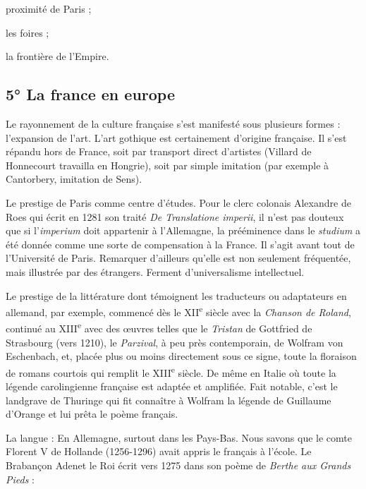 \documentclass[french,twoside]{book} %
\def\bignobreak{\ifdim\lastskip<\bigskipamount
  \removelastskip\nopagebreak\bigskip\fi}
\newcommand{\labelblock}[1]{\bigskip{\color{rubric}\bfseries\centering #1\par}\bignobreak}
\begin{document}
\begin{listalpha}[itemsep=0pt,]
\item[] \hspace{-1.5em}{\bfseries Mais la Champagne :}
\item proximité de Paris ;
\item les foires ;
\item la frontière de l’Empire.

\end{listalpha}\subsection[5° La france en europe]{5° La france en europe}
\label{c03c5}

\labelblock{— Aspect culturel.}

\noindent Le rayonnement de la culture française s’est manifesté sous plusieurs formes : l’expansion de l’art. L’art gothique est certainement d’origine française. Il s’est répandu hors de France, soit par transport direct d’artistes (Villard de Honnecourt travailla en Hongrie), soit par simple imitation (par exemple à Cantorbery, imitation de Sens).\par
Le prestige de Paris comme centre d’études. Pour le clerc colonais Alexandre de Roes qui écrit en 1281 son traité {\itshape De Translatione imperii}, il n’est pas douteux que si l’{\itshape imperium} doit appartenir à l’Allemagne, la prééminence dans le {\itshape studium} a été donnée comme une sorte de compensation à la France. Il s’agit avant tout de l’Université de Paris. Remarquer d’ailleurs qu’elle est non seulement fréquentée, mais illustrée par des étrangers. Ferment d’universalisme intellectuel.\par
Le prestige de la littérature dont témoignent les traducteurs ou adaptateurs en allemand, par exemple, commencé dès le XII\textsuperscript{e} siècle avec la {\itshape Chanson de Roland}, continué au XIII\textsuperscript{e} avec des œuvres telles que le {\itshape Tristan} de Gottfried de Strasbourg (vers 1210), le {\itshape Parzival}, à peu près contemporain, de Wolfram von Eschenbach, et, placée plus ou moins directement sous ce signe, toute la floraison de romans courtois qui remplit le XIII\textsuperscript{e} siècle. De même en Italie où toute la légende carolingienne française est adaptée et amplifiée. Fait notable, c’est le landgrave de Thuringe qui fit connaître à Wolfram la légende de Guillaume d’Orange et lui prêta le poème français.\par
La langue : En Allemagne, surtout dans les Pays-Bas. Nous savons que le comte Florent V de Hollande (1256-1296) avait appris le français à l’école. Le Brabançon Adenet le Roi écrit vers 1275 dans son poème de {\itshape Berthe aux Grands Pieds} :\par
\end{document}
